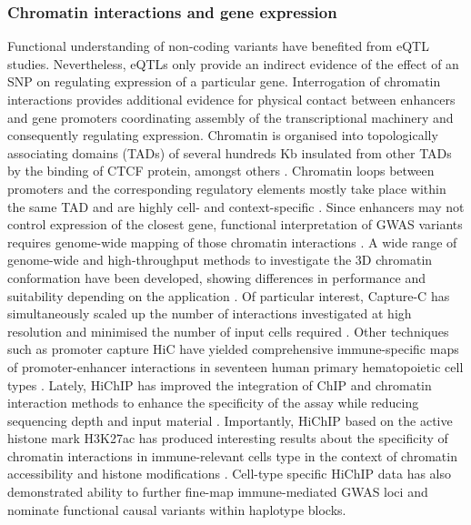 
\subsubsection{Chromatin interactions and gene expression}
Functional understanding of non-coding variants have benefited from eQTL studies. Nevertheless, eQTLs only provide an indirect evidence of the effect of an SNP on regulating expression of a particular gene. Interrogation of chromatin interactions provides additional evidence for physical contact between enhancers and gene promoters coordinating assembly of the transcriptional machinery and consequently regulating expression. Chromatin is organised into topologically associating domains (TADs) of several hundreds Kb insulated from other TADs by the binding of CTCF protein, amongst others \parencite{Nora2017}. Chromatin loops between promoters and the corresponding regulatory elements mostly take place within the same TAD and are highly cell- and context-specific \parencite{Smith2016}. Since enhancers may not control expression of the closest gene, functional interpretation of GWAS variants requires genome-wide mapping of those chromatin interactions \parencite{Smemo2014}. A wide range of genome-wide and high-throughput methods to investigate the 3D chromatin conformation have been developed, showing differences in performance and suitability depending on the application \parencite{Davies2017}. Of particular interest, Capture-C has simultaneously scaled up the number of interactions investigated at high resolution and minimised the number of input cells required \parencite{Davies2016,Oudelaar2017}. Other techniques such as promoter capture HiC have yielded comprehensive immune-specific maps of promoter-enhancer interactions in seventeen human primary hematopoietic cell types \parencite{Javierre2016}. Lately, HiChIP has improved the integration of ChIP and chromatin interaction methods to enhance the specificity of the assay while reducing sequencing depth and input material \parencite{Mumbach2016}. Importantly, HiChIP based on the active histone mark H3K27ac has produced interesting results about the specificity of chromatin interactions in immune-relevant cells type in the context of chromatin accessibility and histone modifications \parencite{Mumbach2017}. Cell-type specific HiChIP data has also demonstrated ability to further fine-map immune-mediated GWAS loci and nominate functional causal variants within haplotype blocks.


